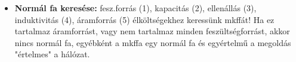 \documentclass[../../szobeli.tex]{subfiles}
\begin{document}
\begin{itemize}
\begin{itemize}
            \item \textbf{Normál fa keresése:} fesz.forrás (1), kapacitás (2), ellenállás (3), induktivitás (4), áramforrás (5) élköltségekhez keressünk mkffát! Ha ez tartalmaz áramforrást, vagy nem tartalmaz minden feszültségforrást, akkor nincs normál fa, egyébként a mkffa egy normál fa és egyértelmű a megoldás "értelmes" a hálózat.
        \end{itemize}
    \end{itemize}
    
\end{document}
